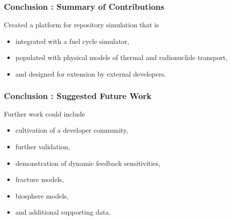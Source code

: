 
\begin{frame}[ctb!]
  \frametitle{Conclusion : Summary of Contributions}
  Created a platform for repository simulation that is
  \begin{itemize}
  \item integrated with a fuel cycle simulator,
  \item populated with physical models of thermal and radionuclide transport,
  \item and designed for extension by external developers.
  \end{itemize}
\end{frame}

\begin{frame}[ctb!]
  \frametitle{Conclusion : Suggested Future Work}
  Further work could include
  \begin{itemize}
  \item cultivation of a developer community,
  \item further validation,
  \item demonstration of dynamic feedback sensitivities,
  \item fracture models,
  \item biosphere models,
  \item and additional supporting data.
  \end{itemize}
\end{frame}

